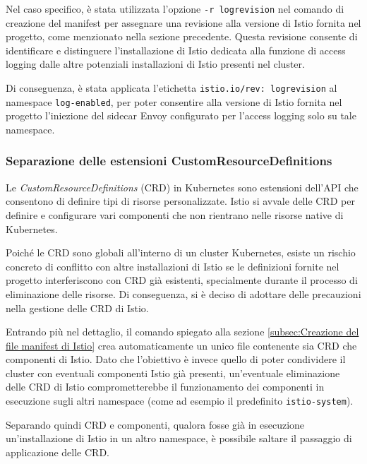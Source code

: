 Nel caso specifico, è stata utilizzata l'opzione \texttt{-r logrevision} nel comando di creazione del manifest per assegnare una revisione alla versione di Istio fornita nel progetto, come menzionato nella sezione precedente. Questa revisione consente di identificare e distinguere l'installazione di Istio dedicata alla funzione di access logging dalle altre potenziali installazioni di Istio presenti nel cluster.

Di conseguenza, è stata applicata l'etichetta \verb|istio.io/rev: logrevision| al namespace \verb|log-enabled|, per poter consentire alla versione di Istio fornita nel progetto l'iniezione del sidecar Envoy configurato per l'access logging solo su tale namespace.

\subsubsection{Separazione delle estensioni CustomResourceDefinitions}
Le \textit{CustomResourceDefinitions} (CRD) in Kubernetes sono estensioni dell'API che consentono di definire tipi di risorse personalizzate. Istio si avvale delle CRD per definire e configurare vari componenti che non rientrano nelle risorse native di Kubernetes.

Poiché le CRD sono globali all'interno di un cluster Kubernetes, esiste un rischio concreto di conflitto con altre installazioni di Istio se le definizioni fornite nel progetto interferiscono con CRD già esistenti, specialmente durante il processo di eliminazione delle risorse. Di conseguenza, si è deciso di adottare delle precauzioni nella gestione delle CRD di Istio.

Entrando più nel dettaglio, il comando spiegato alla sezione \ref{subsec:Creazione del file manifest di Istio} crea automaticamente un unico file contenente sia CRD che componenti di Istio. Dato che l'obiettivo è invece quello di poter condividere il cluster con eventuali componenti Istio già presenti, un'eventuale eliminazione delle CRD di Istio comprometterebbe il funzionamento dei componenti in esecuzione sugli altri namespace (come ad esempio il predefinito \verb|istio-system|).

Separando quindi CRD e componenti, qualora fosse già in esecuzione un'installazione di Istio in un altro namespace, è possibile saltare il passaggio di applicazione delle CRD.

